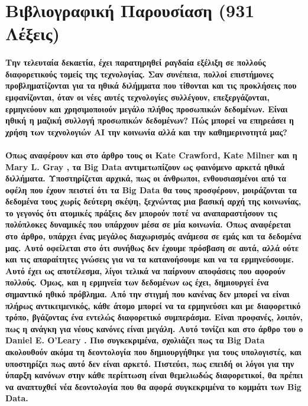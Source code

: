 \documentclass[12pt, A4]{article}
\newcommand{\tl}{\textlatin}
\begin{document}
    \section{Βιβλιογραφική Παρουσίαση (931 Λέξεις)}
    \paragraph{Την τελευταία δεκαετία, έχει παρατηρηθεί ραγδαία εξέλιξη σε πολλούς διαφορετικούς τομείς της τεχνολογίας. Σαν συνέπεια, πολλοί επιστήμονες προβληματίζονται για τα ηθικά διλήμματα που τίθονται και τις προκλήσεις που εμφανίζονται, όταν οι νέες αυτές τεχνολογίες συλλέγουν, επεξεργάζονται, ερμηνεύουν και χρησιμοποιούν μεγάλο πλήθος προσωπικών δεδομένων. Είναι ηθική η μαζική συλλογή προσωπικών δεδομένων? Πώς μπορεί να επηρεάσει η χρήση των τεχνολογιών \tl{AI} την κοινωνία αλλά και την καθημερινοτητά μας?}
    
    \paragraph{Όπως αναφέρουν και στο άρθρο τους οι \tl{Kate Crawford, Kate Milner} και η \tl{Mary L. Gray} \cite{article2}, τα \tl{Big Data} αντιμετωπίζουν ως φαινόμενο αρκετά ηθικά διλλήματα. 
    Υποστηρίζεται αρχικά, πως οι άνθρωποι, ενθουσιασμένοι από τα οφέλη που έχουν πειστεί ότι τα \tl{Big Data} θα τους προσφέρουν, μοιράζονται τα δεδομένα τους χωρίς δεύτερη σκέψη, ξεχνώντας μια βασική αρχή της κοινωνίας, το γεγονός ότι ατομικές πράξεις δεν μπορούν ποτέ να αναπαραστήσουν τις πολύπλοκες δυναμικές που υπάρχουν μέσα σε μία κοινωνία. Όπως αναφέρεται στο άρθρο, υπάρχει ένας μεγάλος διαχωρισμός ανάμεσα σε εμάς και τα δεδομένα μας. Αυτό οφείλεται στο ότι συνήθως δεν έχουμε πρόσβαση σε αυτά, αλλά ούτε και τις απαραίτητες γνώσεις για να τα κατανοήσουμε και να τα ερμηνεύσουμε. Αυτό έχει ως αποτέλεσμα, λίγοι τελικά να παίρνουν αποφάσεις που αφορούν πολλούς. Όμως, και η ερμηνεία των δεδομένων ως έχει, δημιουργεί ένα σημαντικό ηθικό πρόβλημα. Από την στιγμή που κανένας δεν μπορεί να είναι πλήρως αντικειμενικός, κάθε άτομο μπορεί να τα ερμηνεύσει και με διαφορετικό τρόπο, βγάζοντας ένα εντελώς διαφορετικό συμπεράσμα. Είναι προφανές, λοιπόν, πως η ανάγκη για νέους κανόνες είναι μεγάλη. Αυτό τονίζει και στο άρθρο του ο \tl{Daniel E. O’Leary} \cite{article5}. Πιο συγκεκριμένα, σχολιάζει πως τα \tl{Big Data} ακολουθούν ακόμα τη δεοντολογία που δημιουργήθηκε για τους υπολογιστές, και υποστηρίζει πως αυτό δεν είναι αρκετό. Πιστεύει, πως επειδή οι λόγοι για την ύπαρξη κανόνων στην κάθε περίπτωση είναι θεμελιωδώς διαφορετικοί, θα πρέπει να αναπτυχθεί νέα δεοντολογία που θα αφορά συγκεκριμένα το κομμάτι των \tl{Big Data}.}
\end{document}
